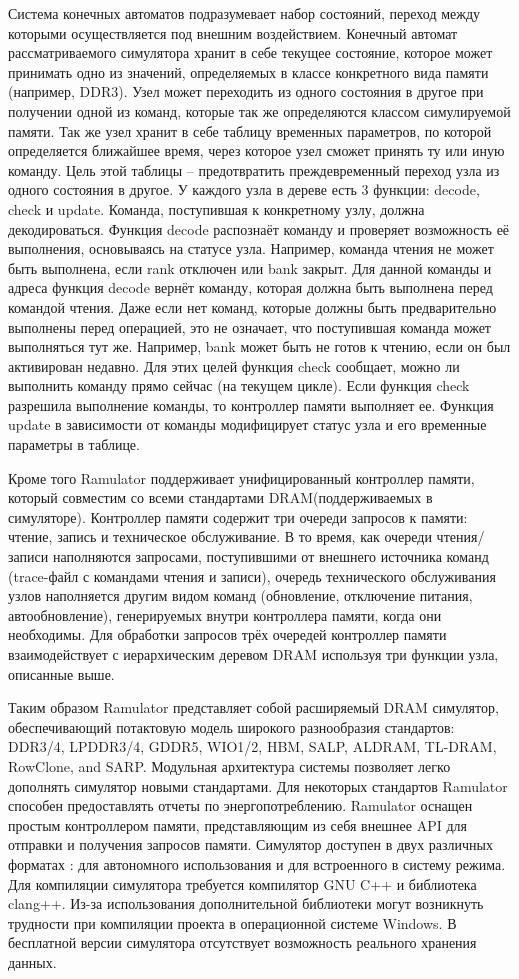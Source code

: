 Система конечных автоматов подразумевает набор состояний, переход между которыми осуществляется под внешним воздействием. Конечный автомат рассматриваемого симулятора хранит в себе текущее состояние, которое может принимать одно из значений, определяемых в классе конкретного вида памяти (например, DDR3). Узел может переходить из одного состояния в другое при получении одной из команд, которые так же определяются классом симулируемой памяти. Так же узел хранит в себе таблицу временных параметров, по которой определяется ближайшее время, через которое узел сможет принять ту или иную команду. Цель этой таблицы – предотвратить преждевременный переход узла из одного состояния в другое.  У каждого узла в дереве есть 3 функции: decode, check и update. Команда, поступившая к конкретному узлу, должна декодироваться. Функция decode распознаёт команду и проверяет возможность её выполнения, основываясь на статусе узла. Например, команда чтения не может быть выполнена, если rank отключен или bank закрыт. Для данной команды и адреса функция decode вернёт команду, которая должна быть выполнена перед командой чтения.  Даже если нет команд, которые должны быть предварительно выполнены перед операцией, это не означает, что поступившая команда может выполняться тут же. Например, bank может быть не готов к чтению, если он был активирован недавно. Для этих целей функция check сообщает, можно ли выполнить команду прямо сейчас (на текущем цикле). Если функция check разрешила выполнение команды, то контроллер памяти выполняет ее. Функция update в зависимости от команды модифицирует статус узла и его временные параметры в таблице.

Кроме того Ramulator поддерживает унифицированный контроллер памяти, который совместим со всеми стандартами DRAM(поддерживаемых в симуляторе). Контроллер памяти содержит три очереди запросов к памяти:  чтение, запись и техническое обслуживание. В то время, как очереди чтения/записи наполняются запросами, поступившими от внешнего источника команд (trace-файл с командами чтения и записи), очередь технического обслуживания узлов наполняется другим видом команд (обновление, отключение питания, автообновление), генерируемых внутри контроллера памяти, когда они необходимы. Для обработки запросов трёх очередей контроллер памяти взаимодействует с иерархическим деревом DRAM используя три функции узла, описанные выше.  

Таким образом Ramulator представляет собой расширяемый DRAM симулятор, обеспечивающий потактовую модель широкого разнообразия стандартов: DDR3/4, LPDDR3/4, GDDR5, WIO1/2, HBM, SALP, ALDRAM, TL-DRAM, RowClone, and SARP. Модульная архитектура системы позволяет легко дополнять симулятор новыми стандартами. Для некоторых стандартов Ramulator способен предоставлять отчеты по энергопотреблению. Ramulator оснащен простым контроллером памяти, представляющим из себя внешнее API для отправки и получения запросов памяти. Симулятор доступен в двух различных форматах : для автономного использования и для встроенного в систему режима. Для компиляции симулятора требуется компилятор GNU C++ и библиотека clang++. Из-за использования дополнительной библиотеки могут возникнуть трудности при компиляции проекта в операционной системе Windows. В бесплатной версии симулятора отсутствует возможность реального хранения данных.

